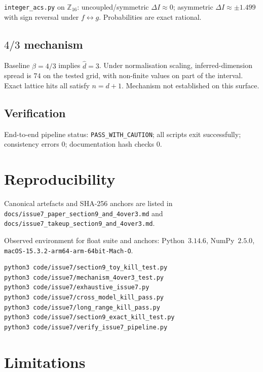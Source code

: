 \documentclass[11pt]{article}
\begin{document}
\texttt{integer\_acs.py} on $\mathbb{Z}_{16}$: uncoupled/symmetric
$\Delta I\approx 0$; asymmetric $\Delta I\approx\pm 1.499$ with sign
reversal under $f\leftrightarrow g$.  Probabilities are exact rational.

\subsection{$4/3$ mechanism}

Baseline $\beta=4/3$ implies $\hat d=3$.  Under normalisation scaling,
inferred-dimension spread is $74$ on the tested grid, with non-finite
values on part of the interval.  Exact lattice hits all satisfy
$n=d+1$.  Mechanism not established on this surface.

\subsection{Verification}

End-to-end pipeline status: \texttt{PASS\_WITH\_CAUTION};
all scripts exit successfully; consistency errors $0$; documentation
hash checks $0$.

\section{Reproducibility}

Canonical artefacts and SHA-256 anchors are listed in
\nolinkurl{docs/issue7_paper_section9_and_4over3.md}
and \nolinkurl{docs/issue7_takeup_section9_and_4over3.md}.

Observed environment for float suite and anchors:
Python~$3.14.6$, NumPy~$2.5.0$,
\nolinkurl{macOS-15.3.2-arm64-arm-64bit-Mach-O}.

\begin{lstlisting}[caption={Reproduction commands}]
python3 code/issue7/section9_toy_kill_test.py
python3 code/issue7/mechanism_4over3_test.py
python3 code/issue7/exhaustive_issue7.py
python3 code/issue7/cross_model_kill_pass.py
python3 code/issue7/long_range_kill_pass.py
python3 code/issue7/section9_exact_kill_test.py
python3 code/issue7/verify_issue7_pipeline.py
\end{lstlisting}

\section{Limitations}
\end{document}
